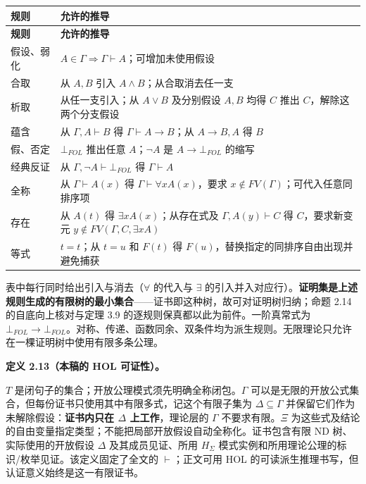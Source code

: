 \documentclass[UTF8,a4paper,zihao=-4,fontset=windows,openany]{ctexbook}
\newcommand{\mcsdisplay}[1]{%
  \par\addvspace{0.7em}%
  \sbox{\mcsmathbox}{\ensuremath{\displaystyle #1}}%
  \ifdim\wd\mcsmathbox>\linewidth
    \noindent\resizebox{\linewidth}{!}{\usebox{\mcsmathbox}}%
  \else
    \noindent\hspace*{\fill}\usebox{\mcsmathbox}\hspace*{\fill}%
  \fi
  \par\addvspace{0.7em}%
}
\def\ensuremath#1{#1}%
\def\mathrm#1{#1}%
\begin{document}
\begingroup\small\setlength{\tabcolsep}{4pt}
\begin{longtable}{>{\raggedright\arraybackslash}p{}>{\raggedright\arraybackslash}p{}}
\toprule
\textbf{规则} & \textbf{允许的推导} \\
\midrule
\endfirsthead
\toprule
\textbf{规则} & \textbf{允许的推导} \\
\midrule
\endhead
\bottomrule
\endfoot
\bottomrule
\endlastfoot
假设、弱化 & \(A\in\Gamma\Rightarrow\Gamma\vdash A\)；可增加未使用假设 \\
合取 & 从 \(A,B\) 引入 \(A\wedge B\)；从合取消去任一支 \\
析取 & 从任一支引入；从 \(A\vee B\) 及分别假设 \(A,B\) 均得 \(C\) 推出 \(C\)，解除这两个分支假设 \\
蕴含 & 从 \(\Gamma,A\vdash B\) 得 \(\Gamma\vdash A\to B\)；从 \(A\to B,A\) 得 \(B\) \\
假、否定 & \(\bot_{\mathrm{FOL}}\) 推出任意 \(A\)；\(\neg A\) 是 \(A\to\bot_{\mathrm{FOL}}\) 的缩写 \\
经典反证 & 从 \(\Gamma,\neg A\vdash\bot_{\mathrm{FOL}}\) 得 \(\Gamma\vdash A\) \\
全称 & 从 \(\Gamma\vdash A(x)\) 得 \(\Gamma\vdash\forall x A(x)\)，要求 \(x\notin FV(\Gamma)\)；可代入任意同排序项 \\
存在 & 从 \(A(t)\) 得 \(\exists x A(x)\)；从存在式及 \(\Gamma,A(y)\vdash C\) 得 \(C\)，要求新变元 \(y\notin FV(\Gamma,C,\exists xA)\) \\
等式 & \(t=t\)；从 \(t=u\) 和 \(F(t)\) 得 \(F(u)\)，替换指定的同排序自由出现并避免捕获 \\
\end{longtable}
\endgroup

表中每行同时给出引入与消去（\(\forall\) 的代入与 \(\exists\) 的引入并入对应行）。\textbf{证明集是上述规则生成的有限树的最小集合}——证书即这种树，故可对证明树归纳；命题 2.14 的自底向上核对与定理 3.9 的逐规则保真都以此为前件。一阶真常式为 \(\bot_{\mathrm{FOL}}\to\bot_{\mathrm{FOL}}\)。对称、传递、函数同余、双条件均为派生规则。无限理论只允许在一棵证明树中使用有限多条公理。

\textbf{定义 2.13（本稿的 HOL 可证性）。}


\mcsdisplay{\Gamma\vdash_T\varphi
\quad\Longleftrightarrow\quad
H_\Sigma\cup\{\widehat\theta:\theta\in T\}
\cup\{\widehat\gamma:\gamma\in\Gamma\}
\vdash_{\mathrm{ND}}\widehat\varphi.}
\noindent \(T\) 是闭句子的集合；开放公理模式须先明确全称闭包。\(\Gamma\) 可以是无限的开放公式集合，但每份证书只使用其中有限多式，记这个有限子集为 \(\Delta\subseteq\Gamma\) 并保留它们作为未解除假设：\textbf{证书内只在 \(\Delta\) 上工作}，理论层的 \(\Gamma\) 不要求有限。\(\Xi\) 为这些式及结论的自由变量指定类型；不能把局部开放假设自动全称化。证书包含有限 ND 树、实际使用的开放假设 \(\Delta\) 及其成员见证、所用 \(H_\Sigma\) 模式实例和所用理论公理的标识/枚举见证。该定义固定了全文的 \(\vdash\)；正文可用 HOL 的可读派生推理书写，但认证意义始终是这一有限证书。
\end{document}
